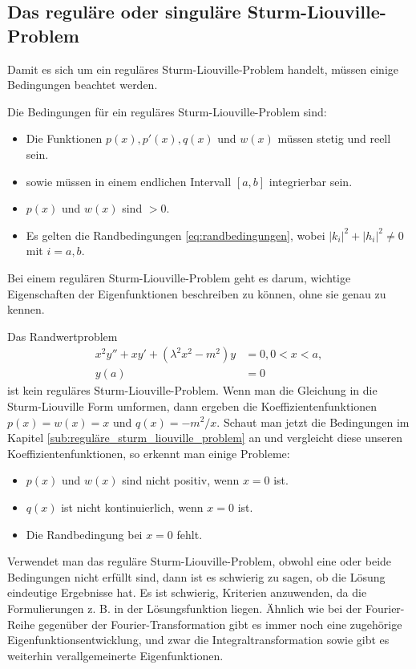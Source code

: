 \subsection{Das reguläre oder singuläre Sturm-Liouville-Problem\label{sub:reguläre_sturm_liouville_problem}}
Damit es sich um ein reguläres Sturm-Liouville-Problem handelt, müssen einige Bedingungen beachtet werden.
\begin{definition}
	\label{def:reguläres_sturm-liouville-problem}
	Die Bedingungen für ein reguläres Sturm-Liouville-Problem sind:
	\begin{itemize}
		\item Die Funktionen $p(x), p'(x), q(x)$ und $w(x)$ müssen stetig und reell sein.
		\item sowie müssen in einem endlichen Intervall $[a,b]$ integrierbar sein.
		\item $p(x)$ und $w(x)$ sind $>0$.
		\item Es gelten die Randbedingungen \eqref{eq:randbedingungen}, wobei $|k_i|^2 + |h_i|^2\ne 0$ mit $i=a,b$.
	\end{itemize}
\end{definition}
Bei einem regulären Sturm-Liouville-Problem geht es darum, wichtige Eigenschaften der Eigenfunktionen beschreiben zu können, ohne sie genau zu kennen.




\begin{beispiel}
	Das Randwertproblem
	\begin{equation}
		\begin{aligned}
		x^2y'' + xy' + (\lambda^2x^2 - m^2)y &= 0, 0<x<a,\\
		y(a) &= 0
		\end{aligned}
	\end{equation}
	ist kein reguläres Sturm-Liouville-Problem.
	Wenn man die Gleichung in die Sturm-Liouville Form umformen, dann ergeben die Koeffizientenfunktionen $p(x) = w(x) = x$ und $q(x) = -m^2/x$.
	Schaut man jetzt die Bedingungen im Kapitel \ref{sub:reguläre_sturm_liouville_problem} an und vergleicht diese unseren Koeffizientenfunktionen, so erkennt man einige Probleme:
	\begin{itemize}
		\item $p(x)$ und $w(x)$ sind nicht positiv, wenn $x = 0$ ist.
		\item $q(x)$ ist nicht kontinuierlich, wenn $x = 0$ ist.
		\item Die Randbedingung bei $x = 0$ fehlt.
	\end{itemize}
\end{beispiel}

Verwendet man das reguläre Sturm-Liouville-Problem, obwohl eine oder beide Bedingungen nicht erfüllt sind, dann ist es schwierig zu sagen, ob die Lösung eindeutige Ergebnisse hat.
Es ist schwierig, Kriterien anzuwenden, da die Formulierungen z. B. in der Lösungsfunktion liegen.
Ähnlich wie bei der Fourier-Reihe gegenüber der Fourier-Transformation gibt es immer noch eine zugehörige Eigenfunktionsentwicklung, und zwar die Integraltransformation sowie gibt es weiterhin verallgemeinerte Eigenfunktionen.

 



